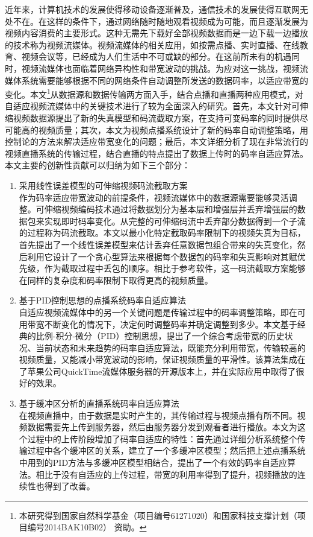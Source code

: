 \begin{cabstract}
\begin{spacing}{1.66}
近年来，计算机技术的发展使得移动设备逐渐普及，通信技术的发展使得互联网无处不在。在这样的条件下，通过网络随时随地观看视频成为可能，而且逐渐发展为视频内容消费的主要形式。这种无需先下载好全部视频数据而是一边下载一边播放的技术称为视频流媒体。视频流媒体的相关应用，如按需点播、实时直播、在线教育、视频会议等，已经成为人们生活中不可或缺的部分。在这前所未有的机遇同时，视频流媒体也面临着网络异构性和带宽波动的挑战。为应对这一挑战，视频流媒体系统需要能够根据不同的网络条件自动调整所发送的数据码率，以适应带宽的变化。本文\footnote{本研究得到国家自然科学基金（项目编号61271020）和国家科技支撑计划（项目编号2014BAK10B02） 资助。}从数据源和数据传输两方面入手，结合点播和直播两种应用模式，对自适应视频流媒体中的关键技术进行了较为全面深入的研究。首先，本文针对可伸缩视频数据源提出了新的失真模型和码流截取方案，在支持可变码率的同时提供尽可能高的视频质量；其次，本文为视频点播系统设计了新的码率自动调整策略，用控制论的方法来解决适应带宽变化的问题；最后，本文详细分析了现在非常流行的视频直播系统的传输过程，结合直播的特点提出了数据上传时的码率自适应算法。本文主要的创新性贡献可以归纳为如下三个部分：
\begin{enumerate}
\item {采用线性误差模型的可伸缩视频码流截取方案}\\
作为码率适应带宽波动的前提条件，视频流媒体中的数据源需要能够灵活调整。可伸缩视频编码技术通过将数据划分为基本层和增强层并丢弃增强层的数据包来实现即时码率变化。从完整的可伸缩码流中丢弃部分数据得到一个子流的过程称为码流截取。本文以最小化特定截取码率限制下的视频失真为目标，首先提出了一个线性误差模型来估计丢弃任意数据包组合带来的失真变化，然后利用它设计了一个贪心型算法来根据每个数据包的码率和失真影响对其赋优先级，作为截取过程中丢包的顺序。相比于参考软件，这一码流截取方案能够在同样的复杂度和码率限制下取得更高的视频质量。
\item {基于PID控制思想的点播系统码率自适应算法}\\
自适应视频流媒体中的另一个关键问题是传输过程中的码率调整策略，即在可用带宽不断变化的情况下，决定何时调整码率并确定调整到多少。本文基于经典的比例-积分-微分（PID）控制思想，提出了一个综合考虑带宽的历史状况、当前状态和未来趋势的码率自适应算法，既能充分利用带宽，传输较高的视频质量，又能减小带宽波动的影响，保证视频质量的平滑性。该算法集成在了苹果公司QuickTime流媒体服务器的开源版本上，并在实际应用中取得了很好的效果。
\item {基于缓冲区分析的直播系统码率自适应算法}\\
在视频直播中，由于数据是实时产生的，其传输过程与视频点播有所不同。视频数据需要先上传到服务器，然后由服务器分发到观看者进行播放。本文为这个过程中的上传阶段增加了码率自适应的特性：首先通过详细分析系统整个传输过程中各个缓冲区的关系，建立了一个多缓冲区模型；然后把上述点播系统中用到的PID方法与多缓冲区模型相结合，提出了一个有效的码率自适应算法。相比于没有自适应的上传过程，带宽的利用率得到了提升，视频播放的连续性也得到了改善。
\end{enumerate}
\end{spacing}
\end{cabstract}

